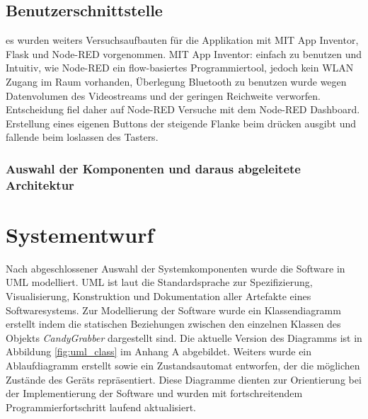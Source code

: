 \documentclass[BMR,Bachelor,ngerman]{twbook}%
\begin{document}
\subsection{Benutzerschnittstelle}
es wurden weiters Versuchsaufbauten für die Applikation mit MIT App Inventor, Flask und Node-RED vorgenommen. 
MIT App Inventor: einfach zu benutzen und Intuitiv, wie Node-RED ein flow-basiertes Programmiertool, jedoch kein WLAN Zugang im Raum vorhanden, Überlegung Bluetooth zu benutzen wurde wegen Datenvolumen des Videostreams und der geringen Reichweite verworfen. Entscheidung fiel daher auf Node-RED
Versuche mit dem Node-RED Dashboard. Erstellung eines eigenen Buttons der steigende Flanke beim drücken ausgibt und fallende beim loslassen des Tasters. 
%
\subsubsection{Auswahl der Komponenten und daraus abgeleitete Architektur}
%
\clearpage
\section{Systementwurf}
Nach abgeschlossener Auswahl der Systemkomponenten wurde die Software in \ac{UML} modelliert. \ac{UML} ist laut  die Standardsprache zur Spezifizierung, Visualisierung, Konstruktion und Dokumentation aller Artefakte eines Softwaresystems. Zur Modellierung der Software wurde ein Klassendiagramm erstellt indem die statischen Beziehungen zwischen den einzelnen Klassen des Objekts \emph{CandyGrabber} dargestellt sind. Die aktuelle Version des Diagramms ist in Abbildung \ref{fig:uml_class} im Anhang A abgebildet. Weiters wurde ein Ablaufdiagramm erstellt sowie ein Zustandsautomat entworfen, der die möglichen Zustände des Geräts repräsentiert. Diese Diagramme dienten zur Orientierung bei der Implementierung der Software und wurden mit fortschreitendem Programmierfortschritt laufend aktualisiert. %
%
\end{document}
